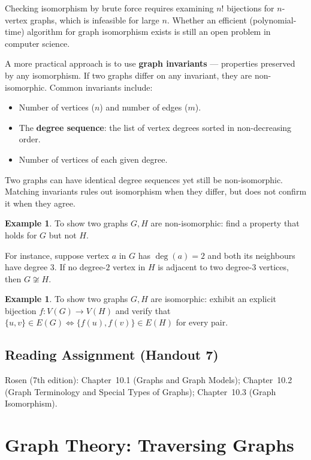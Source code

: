 \documentclass[11pt, a4paper, notitlepage]{report}
\theoremstyle{definition}
\newtheorem{example}[theorem]{Example}
\theoremstyle{remark}
\begin{document}
Checking isomorphism by brute force requires examining $n!$ bijections for $n$-vertex graphs,
which is infeasible for large $n$. Whether an efficient (polynomial-time) algorithm for graph
isomorphism exists is still an open problem in computer science.

A more practical approach is to use \textbf{graph invariants} — properties preserved by
any isomorphism. If two graphs differ on any invariant, they are non-isomorphic. Common
invariants include:
\begin{itemize}
  \item Number of vertices ($n$) and number of edges ($m$).
  \item The \textbf{degree sequence}: the list of vertex degrees sorted in non-decreasing order.
  \item Number of vertices of each given degree.
\end{itemize}

\begin{warning}[title={Matching Invariants is Necessary, Not Sufficient}]
  Two graphs can have identical degree sequences yet still be non-isomorphic. Matching
  invariants rules out isomorphism when they differ, but does not confirm it when they agree.
\end{warning}

\begin{example}
To show two graphs $G, H$ are non-isomorphic: find a property that holds for $G$ but not $H$.

For instance, suppose vertex $a$ in $G$ has $\deg(a) = 2$ and both its neighbours have
degree $3$. If no degree-$2$ vertex in $H$ is adjacent to two degree-$3$ vertices, then
$G \not\cong H$.
\end{example}

\begin{example}
To show two graphs $G, H$ are isomorphic: exhibit an explicit bijection $f : V(G) \to V(H)$
and verify that $\{u,v\} \in E(G) \iff \{f(u),f(v)\} \in E(H)$ for every pair.
\end{example}

\section*{Reading Assignment (Handout 7)}
Rosen (7th edition): Chapter~10.1 (Graphs and Graph Models);
Chapter~10.2 (Graph Terminology and Special Types of Graphs);
Chapter~10.3 (Graph Isomorphism).

\chapter{Graph Theory: Traversing Graphs}
\label{chap:traversing-graphs}
\end{document}
